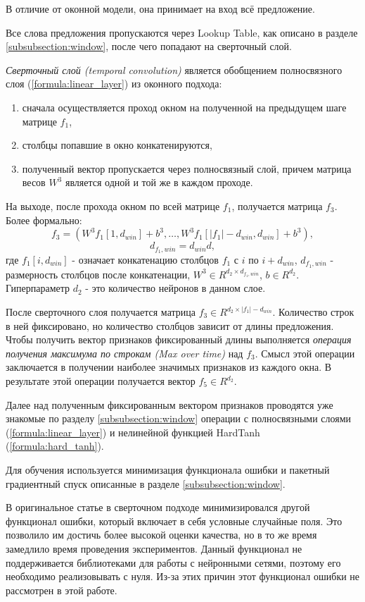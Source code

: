   В отличие от оконной модели, она принимает на вход всё предложение.

  Все слова предложения пропускаются через Lookup Table, как описано в разделе
  \ref{subsubsection:window}, после чего попадают на сверточный слой.

  \textit{Сверточный слой (temporal convolution)} является обобщением
  полносвязного слоя (\ref{formula:linear_layer}) из оконного подхода:
  \begin{enumerate}
    \item сначала осуществляется проход окном на полученной на предыдущем шаге матрице $f_1$,
    \item столбцы попавшие в окно конкатенируются,
    \item полученный вектор пропускается через полносвязный слой,
    причем матрица весов $W^3$ является одной и той же в каждом проходе.
  \end{enumerate}
  На выходе, после прохода окном по всей матрице $f_1$, получается матрица $f_3$.
  Более формально:
  \[
  f_3 =(W^3 f_1[1, d_{win}] + b^3,\ldots,W^3 f_1[|f_1| - d_{win}, d_{win}] + b^3),
  \]
  \[
  d_{f_1, win} = d_{win} d,
  \]
  где $f_1[i, d_{win}]$ - означает конкатенацию столбцов $f_1$ с $i$ по $i + d_{win}$,
  $d_{f_1, win}$ - размерность столбцов после конкатенации,
  $W^3 \in R^{d_{2} \times d_{f_1, win}}$, $b \in R^{d_2}$. Гиперпараметр $d_{2}$ -
  это количество нейронов в данном слое.

  После сверточного слоя получается матрица $f_3 \in R^{d_2\times |f_1| - d_{win}}$.
  Количество строк в ней фиксировано, но количество столбцов зависит от длины предложения.
  Чтобы получить вектор признаков фиксированный длины выполняется \textit{операция
  получения максимума по строкам (Max over time)} над $f_3$.
  Смысл этой операции заключается в получении наиболее значимых признаков из каждого окна.
  В результате этой операции получается вектор $f_5 \in R^{d_2}$.

  Далее над полученным фиксированным вектором признаков проводятся уже
  знакомые по разделу \ref{subsubsection:window}
  операции с полносвязными слоями (\ref{formula:linear_layer}) и
  нелинейной функцией HardTanh (\ref{formula:hard_tanh}).

  Для обучения используется минимизация функционала ошибки и пакетный градиентный
  спуск описанные в разделе \ref{subsubsection:window}.

  В оригинальное статье \citep{collobert2011natural} в сверточном подходе
  минимизировался другой функционал ошибки, который включает в себя условные случайные поля.
  Это позволило им достичь более высокой оценки качества, но в то же время замедлило
  время проведения экспериментов. Данный функционал не поддерживается библиотеками для
  работы с нейронными сетями, поэтому его необходимо реализовывать с нуля.
  Из-за этих причин этот функционал ошибки не рассмотрен в этой работе.

